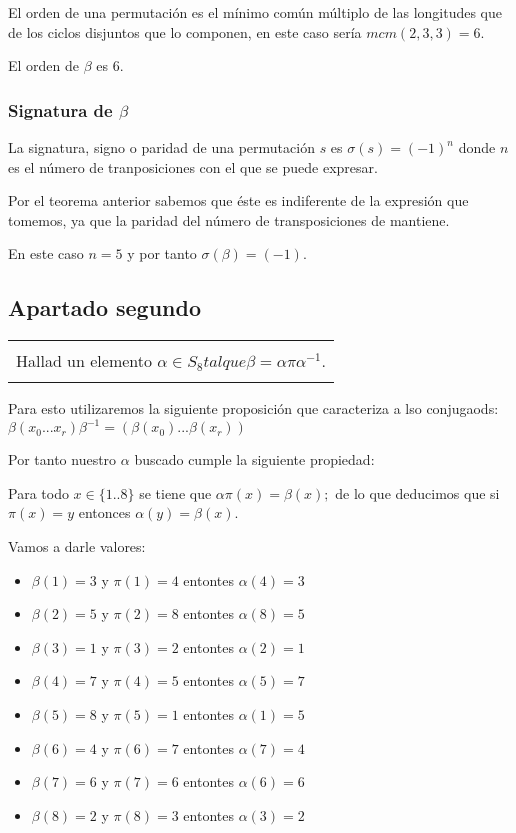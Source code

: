 \documentclass[12pt]{article}
\newenvironment{micaja}
{
    \begin{center}
    \begin{tabular}{|p{0.9\textwidth}|}
    \hline\\
    }   
    {   
    \\\\\hline
    \end{tabular} 
    \end{center}
    }
\begin{document}
El orden de una permutación es el mínimo común múltiplo de las longitudes que de los ciclos disjuntos que lo componen, en este caso sería $mcm(2,3,3)=6.$

El orden de $\beta$ es 6.

\subsubsection*{Signatura de $\beta$}

La signatura, signo o paridad de una permutación $s$ es $\sigma(s) = (-1)^n$ donde $n$ es el número de tranposiciones con el que se puede expresar.

Por el teorema anterior sabemos que éste es indiferente de la expresión  que tomemos, ya que la paridad del número de transposiciones de mantiene.

En este caso $n=5$ y por tanto $\sigma(\beta) = (-1).$

\subsection{Apartado segundo}
\begin{micaja}
Hallad un elemento $\alpha  \in S_8 tal que \beta = \alpha \pi \alpha^{-1}.$
\end{micaja}
Para esto utilizaremos la siguiente proposición que caracteriza a lso conjugaods: $\beta (x_0 ... x_r) \beta^{-1} = ( \beta (x_0)... \beta(x_r))$

Por tanto nuestro $\alpha$ buscado cumple la siguiente propiedad:

Para todo $x \in \{1..8\}$ se tiene que $\alpha \pi (x) = \beta(x);$ de lo que deducimos que si $\pi(x)=y$ entonces $\alpha(y) = \beta(x).$

Vamos a darle valores:
\begin{itemize}
\item $\beta(1) = 3$ y $\pi(1)=4$ entontes $\alpha(4)=3$
\item $\beta(2) = 5$ y $\pi(2)=8$ entontes $\alpha(8)=5$
\item $\beta(3) = 1$ y $\pi(3)=2$ entontes $\alpha(2)=1$
\item $\beta(4) = 7$ y $\pi(4)=5$ entontes $\alpha(5)=7$
\item $\beta(5) = 8$ y $\pi(5)=1$ entontes $\alpha(1)=5$
\item $\beta(6) = 4$ y $\pi(6)=7$ entontes $\alpha(7)=4$
\item $\beta(7) = 6$ y $\pi(7)=6$ entontes $\alpha(6)=6$
\item $\beta(8) = 2$ y $\pi(8)=3$ entontes $\alpha(3)=2$
\end{itemize}
\end{document}

